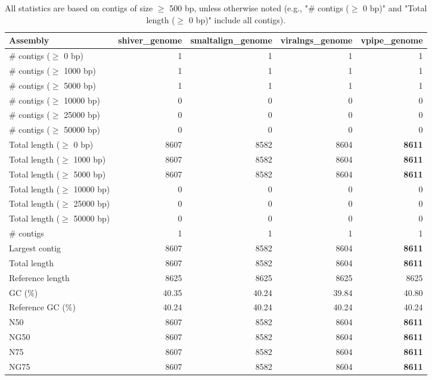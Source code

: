 \documentclass[12pt,a4paper]{article}
\begin{document}
\begin{table}[ht]
\begin{center}
\caption{All statistics are based on contigs of size $\geq$ 500 bp, unless otherwise noted (e.g., "\# contigs ($\geq$ 0 bp)" and "Total length ($\geq$ 0 bp)" include all contigs).}
\begin{tabular}{|l*{4}{|r}|}
\hline
Assembly & shiver\_genome & smaltalign\_genome & viralngs\_genome & vpipe\_genome \\ \hline
\# contigs ($\geq$ 0 bp) & 1 & 1 & 1 & 1 \\ \hline
\# contigs ($\geq$ 1000 bp) & 1 & 1 & 1 & 1 \\ \hline
\# contigs ($\geq$ 5000 bp) & 1 & 1 & 1 & 1 \\ \hline
\# contigs ($\geq$ 10000 bp) & 0 & 0 & 0 & 0 \\ \hline
\# contigs ($\geq$ 25000 bp) & 0 & 0 & 0 & 0 \\ \hline
\# contigs ($\geq$ 50000 bp) & 0 & 0 & 0 & 0 \\ \hline
Total length ($\geq$ 0 bp) & 8607 & 8582 & 8604 & {\bf 8611} \\ \hline
Total length ($\geq$ 1000 bp) & 8607 & 8582 & 8604 & {\bf 8611} \\ \hline
Total length ($\geq$ 5000 bp) & 8607 & 8582 & 8604 & {\bf 8611} \\ \hline
Total length ($\geq$ 10000 bp) & 0 & 0 & 0 & 0 \\ \hline
Total length ($\geq$ 25000 bp) & 0 & 0 & 0 & 0 \\ \hline
Total length ($\geq$ 50000 bp) & 0 & 0 & 0 & 0 \\ \hline
\# contigs & 1 & 1 & 1 & 1 \\ \hline
Largest contig & 8607 & 8582 & 8604 & {\bf 8611} \\ \hline
Total length & 8607 & 8582 & 8604 & {\bf 8611} \\ \hline
Reference length & 8625 & 8625 & 8625 & 8625 \\ \hline
GC (\%) & 40.35 & 40.24 & 39.84 & 40.80 \\ \hline
Reference GC (\%) & 40.24 & 40.24 & 40.24 & 40.24 \\ \hline
N50 & 8607 & 8582 & 8604 & {\bf 8611} \\ \hline
NG50 & 8607 & 8582 & 8604 & {\bf 8611} \\ \hline
N75 & 8607 & 8582 & 8604 & {\bf 8611} \\ \hline
NG75 & 8607 & 8582 & 8604 & {\bf 8611} \\ \hline

\end{tabular}
\end{center}
\end{table}
\end{document}
